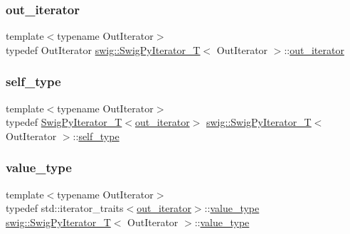 \subsubsection{\texorpdfstring{out\+\_\+iterator}{out\_iterator}}
{\footnotesize\ttfamily template$<$typename Out\+Iterator$>$ \\
typedef Out\+Iterator \hyperlink{classswig_1_1_swig_py_iterator___t}{swig\+::\+Swig\+Py\+Iterator\+\_\+T}$<$ Out\+Iterator $>$\+::\hyperlink{classswig_1_1_swig_py_iterator___t_aec35545038c3d804975a147253f061e4}{out\+\_\+iterator}}

\mbox{\label{classswig_1_1_swig_py_iterator___t_af10eb8078eb41f1dbca3701f27bd8e73}} 
\subsubsection{\texorpdfstring{self\+\_\+type}{self\_type}}
{\footnotesize\ttfamily template$<$typename Out\+Iterator$>$ \\
typedef \hyperlink{classswig_1_1_swig_py_iterator___t}{Swig\+Py\+Iterator\+\_\+T}$<$\hyperlink{classswig_1_1_swig_py_iterator___t_aec35545038c3d804975a147253f061e4}{out\+\_\+iterator}$>$ \hyperlink{classswig_1_1_swig_py_iterator___t}{swig\+::\+Swig\+Py\+Iterator\+\_\+T}$<$ Out\+Iterator $>$\+::\hyperlink{classswig_1_1_swig_py_iterator___t_af10eb8078eb41f1dbca3701f27bd8e73}{self\+\_\+type}}

\mbox{\label{classswig_1_1_swig_py_iterator___t_a1441e2409c41706ad7aee977165f675e}} 
\subsubsection{\texorpdfstring{value\+\_\+type}{value\_type}}
{\footnotesize\ttfamily template$<$typename Out\+Iterator$>$ \\
typedef std\+::iterator\+\_\+traits$<$\hyperlink{classswig_1_1_swig_py_iterator___t_aec35545038c3d804975a147253f061e4}{out\+\_\+iterator}$>$\+::\hyperlink{classswig_1_1_swig_py_iterator___t_a1441e2409c41706ad7aee977165f675e}{value\+\_\+type} \hyperlink{classswig_1_1_swig_py_iterator___t}{swig\+::\+Swig\+Py\+Iterator\+\_\+T}$<$ Out\+Iterator $>$\+::\hyperlink{classswig_1_1_swig_py_iterator___t_a1441e2409c41706ad7aee977165f675e}{value\+\_\+type}}



